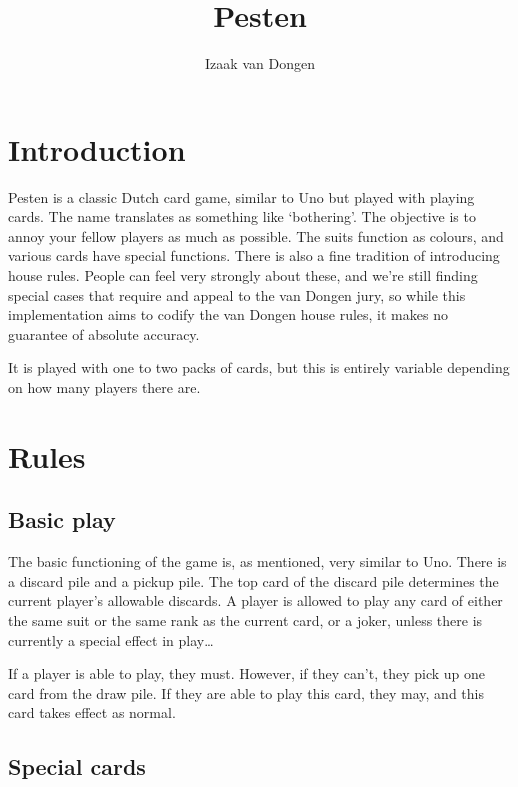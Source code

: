 \documentclass[fleqn,a4paper,11pt]{article}
\title{Pesten}
\author{Izaak van Dongen}
\begin{document}
    \maketitle\thispagestyle{empty} %
    \tableofcontents
    \lstlistoflistings

    \section{Introduction}

    Pesten is a classic Dutch card game, similar to Uno but played with playing
    cards. The name translates as something like `bothering'. The objective is
    to annoy your fellow players as much as possible. The suits function as
    colours, and various cards have special functions. There is also a fine
    tradition of introducing house rules.  People can feel very strongly about
    these, and we're still finding special cases that require and appeal to the
    van Dongen jury, so while this implementation aims to codify the van Dongen
    house rules, it makes no guarantee of absolute accuracy.

    It is played with one to two packs of cards, but this is entirely variable
    depending on how many players there are.

    \section{Rules}

    \subsection{Basic play}

    The basic functioning of the game is, as mentioned, very similar to Uno.
    There is a discard pile and a pickup pile. The top card of the discard pile
    determines the current player's allowable discards. A player is allowed to
    play any card of either the same suit or the same rank as the current card,
    or a joker, unless there is currently a special effect in play\ldots

    If a player is able to play, they must. However, if they can't, they pick
    up one card from the draw pile. If they are able to play this card, they
    may, and this card takes effect as normal.

    \subsection{Special cards}
\end{document}
